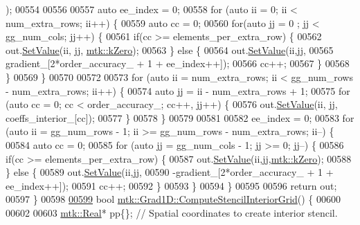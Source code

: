 \begin{DoxyCode}
{{      );
00554 
00556 
00557   \textcolor{keyword}{auto} ee\_index = 0;
00558   \textcolor{keywordflow}{for} (\textcolor{keyword}{auto} ii = 0; ii < num\_extra\_rows; ii++) \{
00559     \textcolor{keyword}{auto} cc = 0;
00560     \textcolor{keywordflow}{for}(\textcolor{keyword}{auto} jj = 0 ; jj < gg\_num\_cols; jj++) \{
00561       \textcolor{keywordflow}{if}(cc >= elements\_per\_extra\_row) \{
00562         out.\hyperlink{classmtk_1_1DenseMatrix_a784ce5784109ac86bfb9d8562b334b13}{SetValue}(ii, jj, \hyperlink{group__c01-roots_ga59a451a5fae30d59649bcda274fea271}{mtk::kZero});
00563       \} \textcolor{keywordflow}{else} \{
00564         out.\hyperlink{classmtk_1_1DenseMatrix_a784ce5784109ac86bfb9d8562b334b13}{SetValue}(ii,jj,
00565                      gradient\_[2*order\_accuracy\_ + 1 + ee\_index++]);
00566         cc++;
00567       \}
00568     \}
00569   \}
00570 
00572 
00573   \textcolor{keywordflow}{for} (\textcolor{keyword}{auto} ii = num\_extra\_rows; ii < gg\_num\_rows - num\_extra\_rows; ii++) \{
00574     \textcolor{keyword}{auto} jj = ii - num\_extra\_rows + 1;
00575     \textcolor{keywordflow}{for} (\textcolor{keyword}{auto} cc = 0; cc < order\_accuracy\_; cc++, jj++) \{
00576       out.\hyperlink{classmtk_1_1DenseMatrix_a784ce5784109ac86bfb9d8562b334b13}{SetValue}(ii, jj, coeffs\_interior\_[cc]);
00577     \}
00578   \}
00579 
00581 
00582   ee\_index = 0;
00583   \textcolor{keywordflow}{for} (\textcolor{keyword}{auto} ii = gg\_num\_rows - 1; ii >= gg\_num\_rows - num\_extra\_rows; ii--) \{
00584     \textcolor{keyword}{auto} cc = 0;
00585     \textcolor{keywordflow}{for} (\textcolor{keyword}{auto} jj = gg\_num\_cols - 1; jj >= 0; jj--) \{
00586       \textcolor{keywordflow}{if}(cc >= elements\_per\_extra\_row) \{
00587         out.\hyperlink{classmtk_1_1DenseMatrix_a784ce5784109ac86bfb9d8562b334b13}{SetValue}(ii,jj,\hyperlink{group__c01-roots_ga59a451a5fae30d59649bcda274fea271}{mtk::kZero});
00588       \} \textcolor{keywordflow}{else} \{
00589         out.\hyperlink{classmtk_1_1DenseMatrix_a784ce5784109ac86bfb9d8562b334b13}{SetValue}(ii,jj,
00590                      -gradient\_[2*order\_accuracy\_ + 1 + ee\_index++]);
00591         cc++;
00592       \}
00593      \}
00594   \}
00595 
00596   \textcolor{keywordflow}{return} out;
00597 \}
00598 
\hypertarget{mtk__grad__1d_8cc_source_l00599}{}\hyperlink{classmtk_1_1Grad1D_ad6df25cc9dfc85ff8562ae3605486976}{00599} \textcolor{keywordtype}{bool} \hyperlink{classmtk_1_1Grad1D_ad6df25cc9dfc85ff8562ae3605486976}{mtk::Grad1D::ComputeStencilInteriorGrid}() \{
00600 
00602 
00603   \hyperlink{group__c01-roots_gac080bbbf5cbb5502c9f00405f894857d}{mtk::Real}* pp\{\}; \textcolor{comment}{// Spatial coordinates to create interior stencil.}
}}
\end{DoxyCode}
